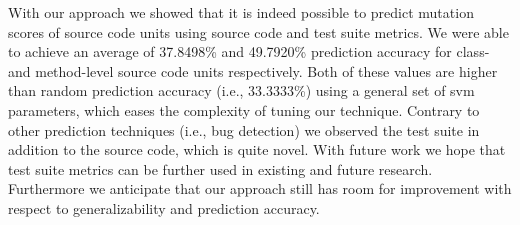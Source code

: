 With our approach we showed that it is indeed possible to predict mutation scores of source code units using source code and test suite metrics. We were able to achieve an average of 37.8498\% and 49.7920\% prediction accuracy for class- and method-level source code units respectively. Both of these values are higher than random prediction accuracy (i.e., 33.3333\%) using a general set of \gls{svm} parameters, which eases the complexity of tuning our technique. Contrary to other prediction techniques (i.e., bug detection) we observed the test suite in addition to the source code, which is quite novel. With future work we hope that test suite metrics can be further used in existing and future research. Furthermore we anticipate that our approach still has room for improvement with respect to generalizability and prediction accuracy.
